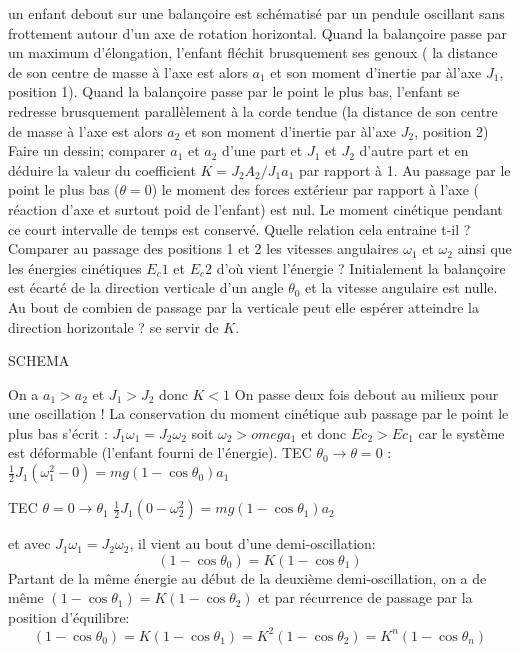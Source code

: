 \begin{Exercise}[title=(*) Mouvement amplifié sur une balançoire]
	un enfant debout sur une balançoire est schématisé par un pendule oscillant sans frottement autour d'un axe de rotation horizontal. Quand la balançoire passe par un maximum d'élongation, l'enfant fléchit brusquement ses genoux ( la distance de son centre de masse à l'axe est alors $a_1$ et son moment d'inertie par àl'axe $J_1$, position 1). Quand la balançoire passe par le point le plus bas, l'enfant se redresse brusquement parallèlement à la corde tendue (la distance de son centre de masse à l'axe est alors $a_2$ et son moment d'inertie par àl'axe $J_2$, position 2)
	\Question Faire un dessin; comparer $a_1$ et $a_2$ d'une part et $J_1$ et $J_2$ d'autre part et en déduire la valeur du coefficient $K= J_2A_2 /J_1a_1$ par rapport à 1.
	Au passage par le point le plus bas ($\theta=0$) le moment des forces extérieur par rapport à l'axe ( réaction d'axe et surtout poid de l'enfant) est nul. Le moment cinétique pendant ce court intervalle de temps est conservé.
	\Question Quelle relation cela entraine t-il ?  Comparer au passage des positions 1 et 2 les vitesses angulaires $\omega_1$ et $\omega_2$ ainsi que les énergies cinétiques $E_c1$ et $E_c2$ d'où vient l'énergie ?
	\Question Initialement la balançoire est écarté de la direction verticale d'un angle $\theta_0$ et la vitesse angulaire est nulle. Au bout de combien de passage par la verticale peut elle espérer atteindre la direction horizontale ? se servir de $K$.
\end{Exercise}
\begin{Answer}

	SCHEMA

	\Question On a $a_1 > a_2$ et $J_1 >J_2 $ donc $K< 1$
	On passe deux fois debout au milieux pour une oscillation !
	\Question La conservation du moment cinétique aub passage par le point le plus bas s'écrit : $J_1 \omega_1 = J_2 \omega_2$ soit $\omega_2 > omega_1$ et donc $Ec_2 > Ec_1 $ car le système est déformable (l'enfant fourni de l'énergie).
	\Question TEC $\theta_0 \to \theta =0 $ : $\frac{1}{2}J_1 (\omega_1^2-0) = mg (1-\cos\theta_0) a_1$

	TEC $\theta=0 \to \theta_1$ $\frac{1}{2}J_1 (0-\omega_2^2) = mg (1-\cos\theta_1) a_2$

	et avec $J_1\omega_1 = J_2\omega_2$, il vient au bout d'une demi-oscillation:
	\[ (1-\cos\theta_0) = K (1-\cos\theta_1) \]
	Partant de la même énergie au début de la deuxième demi-oscillation, on a de même $ (1-\cos\theta_1) = K (1-\cos\theta_2)$ et par récurrence de passage par la position d'équilibre:
	\[ (1-\cos\theta_0) = K (1-\cos\theta_1)= K^2 (1-\cos\theta_2)=K^n(1-\cos\theta_n) \]
\end{Answer}
